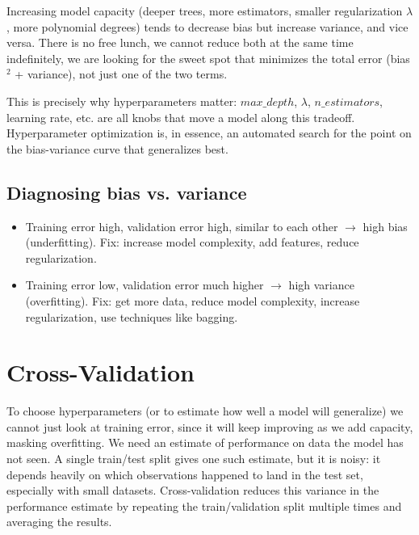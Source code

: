 \documentclass[conference]{IEEEtran}
\begin{document}
Increasing model capacity (deeper trees, more estimators, smaller regularization $\lambda$, more polynomial degrees) tends to decrease bias but increase variance, and vice versa. There is no free lunch, we cannot reduce both at the same time indefinitely, we are looking for the sweet spot that minimizes the total error (bias$^2$ + variance), not just one of the two terms.

This is precisely why hyperparameters matter: $max\_depth$, $\lambda$, $n\_estimators$, learning rate, etc. are all knobs that move a model along this tradeoff. Hyperparameter optimization is, in essence, an automated search for the point on the bias-variance curve that generalizes best.

\subsection*{Diagnosing bias vs. variance}
\begin{itemize}
    \item Training error high, validation error high, similar to each other $\rightarrow$ high bias (underfitting). Fix: increase model complexity, add features, reduce regularization.
    \item Training error low, validation error much higher $\rightarrow$ high variance (overfitting). Fix: get more data, reduce model complexity, increase regularization, use techniques like bagging.
\end{itemize}

\section*{Cross-Validation}
To choose hyperparameters (or to estimate how well a model will generalize) we cannot just look at training error, since it will keep improving as we add capacity, masking overfitting. We need an estimate of performance on data the model has not seen. A single train/test split gives one such estimate, but it is noisy: it depends heavily on which observations happened to land in the test set, especially with small datasets. Cross-validation reduces this variance in the performance estimate by repeating the train/validation split multiple times and averaging the results.
\end{document}

